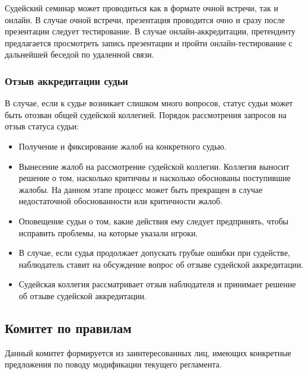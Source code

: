 Судейский семинар может проводиться как в формате очной встречи, так и онлайн. В случае очной встречи, презентация проводится очно и сразу после презентации следует тестирование. В случае онлайн-аккредитации, претенденту предлагается просмотреть запись презентации и пройти онлайн-тестирование с дальнейшей беседой по удаленной связи. 

\subsubsection{Отзыв аккредитации судьи}

В случае, если к судье возникает слишком много вопросов, статус судьи может быть отозван общей судейской коллегией. Порядок рассмотрения запросов на отзыв статуса судьи:

\begin{itemize}
	\item Получение и фиксирование жалоб на конкретного судью.
	\item Вынесение жалоб на рассмотрение судейской коллегии. Коллегия выносит решение о том, насколько критичны и насколько обоснованы поступившие жалобы. На данном этапе процесс может быть прекращен в случае недостаточной обоснованности или критичности жалоб.
	\item Оповещение судьи о том, какие действия ему следует предпринять, чтобы исправить проблемы, на которые указали игроки.
	\item В случае, если судья продолжает допускать грубые ошибки при судействе, наблюдатель ставит на обсуждение вопрос об отзыве судейской аккредитации.
	\item Судейская коллегия рассматривает отзыв наблюдателя и принимает решение об отзыве судейской аккредитации.
\end{itemize}

\subsection{Комитет по правилам}

Данный комитет формируется из заинтересованных лиц, имеющих конкретные предложения по поводу модификации текущего регламента.

